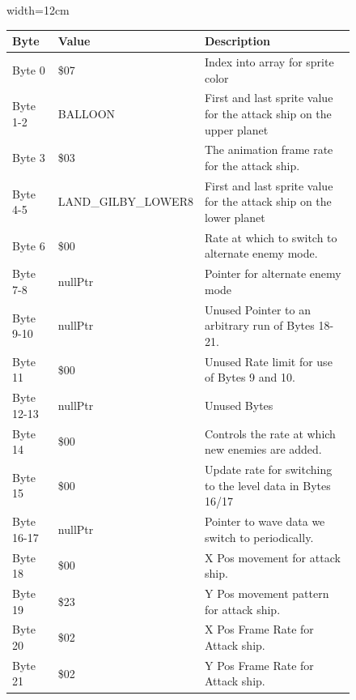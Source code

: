 \begin{figure}[H]
{\begin{adjustbox}{width=12cm}
\begin{tabular}{lll}
\toprule
 Byte       & Value                   & Description                                                         \\
\midrule
 Byte 0     & \$07                     & Index into array for sprite color                                   \\
 Byte 1-2   & BALLOON                 & First and last sprite value for the attack ship on the upper planet \\
 Byte 3     & \$03                     & The animation frame rate for the attack ship.                       \\
 Byte 4-5   & LAND\_GILBY\_LOWER8 & First and last sprite value for the attack ship on the lower planet \\
 Byte 6     & \$00                     & Rate at which to switch to alternate enemy mode.                    \\
 Byte 7-8   & nullPtr                 & Pointer for alternate enemy mode                                    \\
 Byte 9-10  & nullPtr                 & Unused Pointer to an arbitrary run of Bytes 18-21.                  \\
 Byte 11    & \$00                     & Unused Rate limit for use of Bytes 9 and 10.                        \\
 Byte 12-13 & nullPtr                 & Unused Bytes                                                        \\
 Byte 14    & \$00                     & Controls the rate at which new enemies are added.                   \\
 Byte 15    & \$00                     & Update rate for switching to the level data in Bytes 16/17          \\
 Byte 16-17 & nullPtr                 & Pointer to wave data we switch to periodically.                     \\
 Byte 18    & \$00                     & X Pos movement for attack ship.                                     \\
 Byte 19    & \$23                     & Y Pos movement pattern for attack ship.                             \\
 Byte 20    & \$02                     & X Pos Frame Rate for Attack ship.                                   \\
 Byte 21    & \$02                     & Y Pos Frame Rate for Attack ship.                                   \\

\end{tabular}
\end{adjustbox}}
\end{figure}
